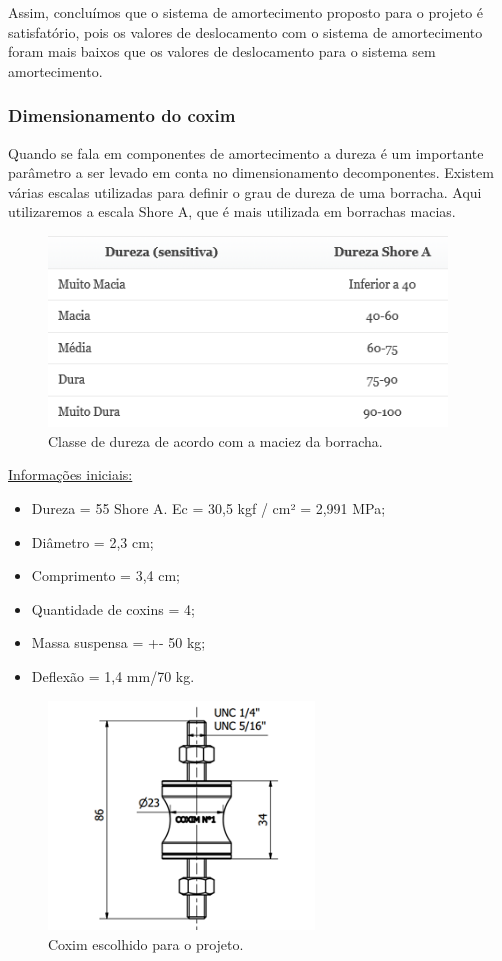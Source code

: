 Assim, concluímos que o sistema de amortecimento proposto para o projeto é satisfatório, pois os valores de deslocamento com o sistema de amortecimento foram mais baixos que os valores de deslocamento para o sistema sem amortecimento.

\subsubsection{Dimensionamento do coxim}

Quando se fala em componentes de amortecimento a dureza é um importante parâmetro a ser levado em conta no dimensionamento decomponentes. Existem várias escalas utilizadas para definir o grau de dureza de uma borracha. Aqui utilizaremos a escala Shore A, que é mais utilizada em borrachas macias.

\begin{figure}[H]
	\centering
	\includegraphics[width=300pt]{figuras/tabela_dureza.png}
	\caption{Classe de dureza de acordo com a maciez da borracha.}
\end{figure}

\underline{Informações iniciais:}

\begin{itemize}
	\item Dureza = 55 Shore A. Ec = 30,5 kgf / cm²  = 2,991 MPa;
	\item Diâmetro = 2,3 cm;
	\item Comprimento = 3,4 cm;
	\item Quantidade de coxins = 4;
	\item Massa suspensa = +- 50 kg;
	\item Deflexão = 1,4 mm/70 kg.
\end{itemize}

\begin{figure}[H]
	\centering
	\includegraphics[width=200pt]{figuras/dimensoes_coxim.png}
	\caption{Coxim escolhido para o projeto.}
\end{figure}

